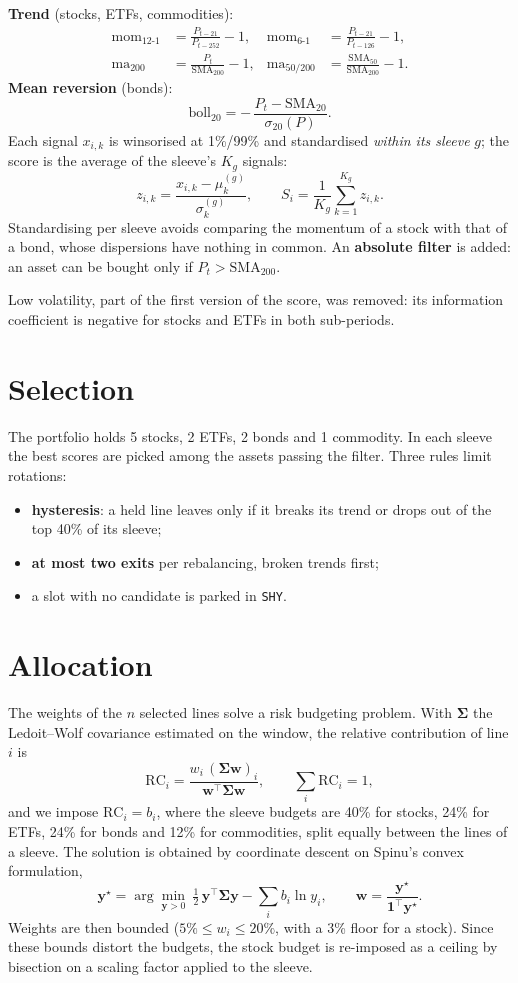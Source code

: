 \documentclass[10pt,twocolumn,a4paper]{extarticle}
\newcommand{\code}[1]{\texttt{\small #1}}
\begin{document}
\textbf{Trend} (stocks, ETFs, commodities):
\begin{align*}
\text{mom}_{12\text{-}1} &= \frac{P_{t-21}}{P_{t-252}}-1, &
\text{mom}_{6\text{-}1} &= \frac{P_{t-21}}{P_{t-126}}-1,\\
\text{ma}_{200} &= \frac{P_t}{\mathrm{SMA}_{200}}-1, &
\text{ma}_{50/200} &= \frac{\mathrm{SMA}_{50}}{\mathrm{SMA}_{200}}-1.
\end{align*}
\textbf{Mean reversion} (bonds):
\[
\text{boll}_{20} = -\,\frac{P_t-\mathrm{SMA}_{20}}{\sigma_{20}(P)}.
\]
Each signal $x_{i,k}$ is winsorised at 1\%/99\% and standardised \emph{within its sleeve} $g$; the score is the average of the sleeve's $K_g$ signals:
\[
z_{i,k}=\frac{x_{i,k}-\mu^{(g)}_k}{\sigma^{(g)}_k},\qquad S_i=\frac{1}{K_g}\sum_{k=1}^{K_g} z_{i,k}.
\]
Standardising per sleeve avoids comparing the momentum of a stock with that of a bond, whose dispersions have nothing in common. An \textbf{absolute filter} is added: an asset can be bought only if $P_t>\mathrm{SMA}_{200}$.

Low volatility, part of the first version of the score, was removed: its information coefficient is negative for stocks and ETFs in both sub-periods.

\section{Selection}
The portfolio holds 5 stocks, 2 ETFs, 2 bonds and 1 commodity. In each sleeve the best scores are picked among the assets passing the filter. Three rules limit rotations:
\begin{itemize}
\item \textbf{hysteresis}: a held line leaves only if it breaks its trend or drops out of the top 40\% of its sleeve;
\item \textbf{at most two exits} per rebalancing, broken trends first;
\item a slot with no candidate is parked in \code{SHY}.
\end{itemize}

\section{Allocation}
The weights of the $n$ selected lines solve a risk budgeting problem. With $\bm\Sigma$ the Ledoit--Wolf covariance estimated on the window, the relative contribution of line $i$ is
\[
\mathrm{RC}_i=\frac{w_i\,(\bm\Sigma\bm w)_i}{\bm w^{\top}\bm\Sigma\bm w},\qquad \sum_i \mathrm{RC}_i=1,
\]
and we impose $\mathrm{RC}_i=b_i$, where the sleeve budgets are 40\% for stocks, 24\% for ETFs, 24\% for bonds and 12\% for commodities, split equally between the lines of a sleeve. The solution is obtained by coordinate descent on Spinu's convex formulation,
\[
\bm y^{\star}=\arg\min_{\bm y>0}\ \tfrac12\,\bm y^{\top}\bm\Sigma\bm y-\sum_i b_i\ln y_i,\qquad \bm w=\frac{\bm y^{\star}}{\bm 1^{\top}\bm y^{\star}}.
\]
Weights are then bounded ($5\%\le w_i\le 20\%$, with a 3\% floor for a stock). Since these bounds distort the budgets, the stock budget is re-imposed as a ceiling by bisection on a scaling factor applied to the sleeve.
\end{document}
